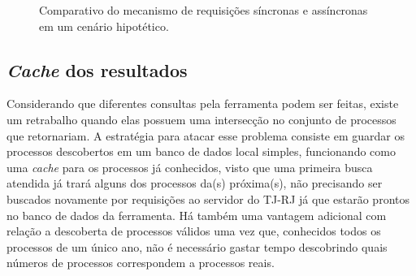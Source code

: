 \begin{figure}[H]

    \caption{%
        Comparativo do mecanismo de requisições síncronas e assíncronas em um
        cenário hipotético.
    }
    \label{gra:modelo-temporização-requisições}
\end{figure}


\subsection{\textit{Cache} dos resultados}

Considerando que diferentes consultas pela ferramenta podem ser feitas, existe
um retrabalho quando elas possuem uma intersecção no conjunto de processos que
retornariam. A estratégia para atacar esse problema consiste em guardar os
processos descobertos em um banco de dados local simples, funcionando como uma
\textit{cache} para os processos já conhecidos, visto que uma primeira
busca atendida já trará alguns dos processos da(s) próxima(s), não precisando
ser buscados novamente por requisições ao servidor do TJ-RJ já que estarão
prontos no banco de dados da ferramenta. Há também uma vantagem adicional com
relação a descoberta de processos válidos uma vez que, conhecidos todos os
processos de um único ano, não é necessário gastar tempo descobrindo quais
números de processos correspondem a processos reais.

